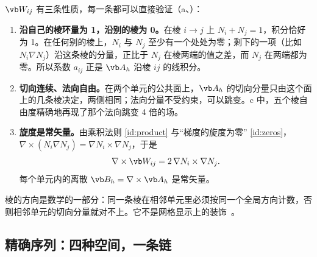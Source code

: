 $\vb W_{ij}$ 有三条性质，每一条都可以直接验证（a、）：
\begin{enumerate}
\item \textbf{沿自己的棱环量为 1，沿别的棱为 0。}在棱 $i\to j$ 上 $N_i+N_j=1$，积分恰好为 1。在任何别的棱上，$N_i$ 与 $N_j$ 至少有一个处处为零；剩下的一项（比如 $N_i\nabla N_j$）沿这条棱的分量，正比于 $N_j$ 在棱两端的值之差，而 $N_j$ 在两端都为零。所以系数 $a_{ij}$ 正是 $\vb A_h$ 沿棱 $ij$ 的线积分。
\item \textbf{切向连续、法向自由。}在两个单元的公共面上，$\vb A_h$ 的切向分量只由这个面上的几条棱决定，两侧相同；法向分量不受约束，可以跳变。c 中，五个棱自由度精确地再现了那个法向跳变 4 倍的场。
\item \textbf{旋度是常矢量。}由乘积法则 \eqref{id:product} 与“梯度的旋度为零” \eqref{id:zeros}，$\nabla\times(N_i\nabla N_j)=\nabla N_i\times\nabla N_j$，于是
\begin{equation*}
\nabla\times\vb W_{ij}=2\,\nabla N_i\times\nabla N_j .
\end{equation*}
每个单元内的离散 $\vb B_h=\nabla\times\vb A_h$ 是常矢量。
\end{enumerate}
棱的方向是数学的一部分：同一条棱在相邻单元里必须按同一个全局方向计数，否则相邻单元的切向分量就对不上。它不是网格显示上的装饰~\cite{mfem}。


\subsection{精确序列：四种空间，一条链}

